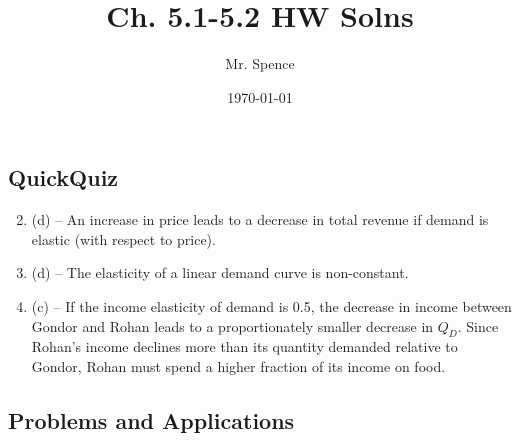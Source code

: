 \documentclass{article}
\title{Ch. 5.1-5.2 HW Solns}
\author{Mr. Spence}
\date{\today}
\begin{document}
\maketitle

\subsection*{QuickQuiz}

\begin{enumerate}
\setcounter{enumi}{1}

\item (d) -- An increase in price leads to a decrease in total revenue if demand is elastic (with respect to price).

\item (d) -- The elasticity of a linear demand curve is non-constant.

\item (c) -- If the income elasticity of demand is 0.5, the decrease in income between Gondor and Rohan leads to a proportionately smaller decrease in $Q_D$. Since Rohan's income declines more than its quantity demanded relative to Gondor, Rohan must spend a higher fraction of its income on food. 


\end{enumerate}

\subsection*{Problems and Applications}
\end{document}
